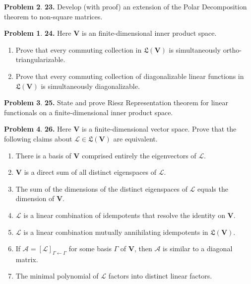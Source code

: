 \documentclass{book}
\theoremstyle{definition}
\newtheorem*{prob*}{Problem}
\newcommand{\V}{\mathbf{V}}
\newcommand{\A}{\mathcal{A}}
\newcommand{\lag}{\mathcal{L}}
\newcommand{\LL}{\mathfrak{L}}
\begin{document}
\begin{prob*}\textbf{23.} Develop (with proof) an extension of the Polar Decomposition theorem to non-square matrices.
	
	
	
	
\newpage





\begin{prob*}\textbf{24.} Here $\V$ is an finite-dimensional inner product space. 
	\begin{enumerate}
		\item Prove that every commuting collection in $\LL(\V)$ is simultaneously ortho-triangularizable.
		
		\item Prove that every commuting collection of diagonalizable linear functions in $\LL(\V)$ is simultaneously diagonalizable.
	\end{enumerate}
	
\end{prob*}
	
\end{prob*}




\newpage



\begin{prob*}\textbf{25.} State and prove Riesz Representation theorem for linear functionals on a finite-dimensional inner product space. 
	
\end{prob*}



\newpage




\begin{prob*}\textbf{26.} Here $\V$ is a finite-dimensional vector space. Prove that the following claims about $\lag \in \LL(\V)$ are equivalent.
	\begin{enumerate}
		\item There is a basis of $\V$ comprised entirely the eigenvectors of $\lag$.
		\item $\V$ is a direct sum of all distinct eigenspaces of $\lag$.
		\item The sum of the dimensions of the distinct eigenspaces of $\lag$ equals the dimension of $\V$.
		\item $\lag$ is a linear combination of idempotents that resolve the identity on $\V$.
		\item $\lag$ is a linear combination mutually annihilating idempotents in $\LL(\V)$.
		\item If $\A = [\lag]_{\Gamma\leftarrow\Gamma}$ for some basis $\Gamma$ of $\V$, then $\A$ is similar to a diagonal matrix.
		\item The minimal polynomial of $\lag$ factors into distinct linear factors. 
	\end{enumerate}
	
\end{prob*}
\end{document}

